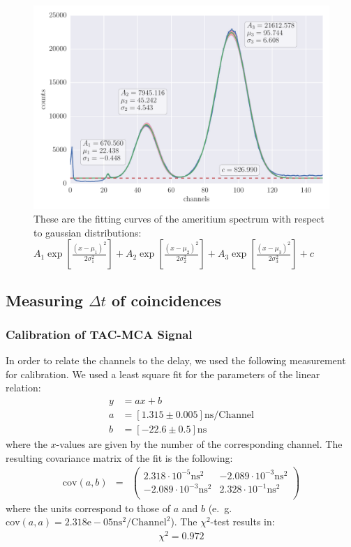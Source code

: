 \clearpage
\begin{figure}[htpb]
    \centering
    \includegraphics[width=1.1\linewidth]{analysis/figures/plot6_3_reg}
    \caption{These are the fitting curves of the ameritium spectrum with respect to gaussian distributions:
        $A_1\exp{\left[\frac{(x-\mu_1)^2}{2 \sigma_1^2} \right]}+
         A_2\exp{\left[\frac{(x-\mu_2)^2}{2 \sigma_2^2} \right]}+
         A_3\exp{\left[\frac{(x-\mu_3)^2}{2 \sigma_3^2} \right]}+ c$}
         \label{fig:name}
\end{figure}
\subsection{Measuring $\Delta t$ of coincidences}

\subsubsection{Calibration of TAC-MCA Signal}
\label{subs:calib_TAC}
In order to relate the channels to the delay, we used the following
measurement for calibration. We used a least square fit for the parameters
of the linear relation:
\begin{align}
    \label{eq:coeff}
    y &= ax + b \\
    a &= \left[ 1.315 \pm 0.005 \right] \mathrm{ns} / \mathrm{Channel}\\
    b &= \left[ -22.6 \pm 0.5 \right]\mathrm{ns} 
\end{align}
where the $x$-values are given by the number of the corresponding channel. 
The resulting covariance matrix of the fit is the following:
\begin{align}
    \label{eq:cov}
    \mathrm{cov}(a, b) &=& 
    \begin{pmatrix}
        2.318 \cdot 10^{-5}\mathrm{ns}^2 &-2.089\cdot 10^{-3}\mathrm{ns}^2\\
        -2.089\cdot 10^{-3}\mathrm{ns}^2&2.328\cdot 10^{-1}\mathrm{ns}^2\\
    \end{pmatrix}
\end{align}
where the units correspond to those of $a$ and $b$ 
(e.~g. $\mathrm{cov}(a,a) = 2.318\mathrm{e}-05 \mathrm{ns^2} / \mathrm{Channel}^2$).
The $\chi^2$-test results in:
\begin{align}
    \label{eq:}
   \chi^2 = 0.972
\end{align}

